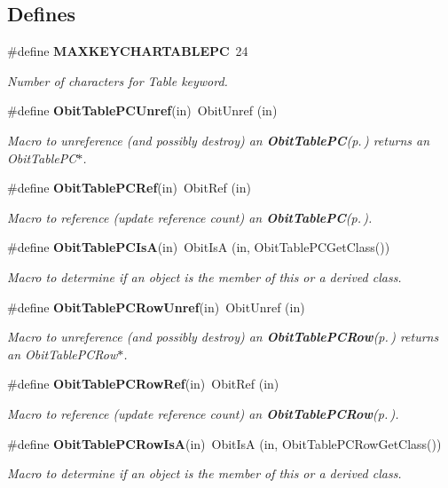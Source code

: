\subsection*{Defines}
\begin{CompactItemize}
\item 
\#define {\bf MAXKEYCHARTABLEPC}\ 24
\begin{CompactList}\small\item\em Number of characters for Table keyword. \item\end{CompactList}\item 
\#define {\bf Obit\-Table\-PCUnref}(in)\ Obit\-Unref (in)
\begin{CompactList}\small\item\em Macro to unreference (and possibly destroy) an {\bf Obit\-Table\-PC}{\rm (p.\,\pageref{structObitTablePC})} returns an Obit\-Table\-PC$\ast$. \item\end{CompactList}\item 
\#define {\bf Obit\-Table\-PCRef}(in)\ Obit\-Ref (in)
\begin{CompactList}\small\item\em Macro to reference (update reference count) an {\bf Obit\-Table\-PC}{\rm (p.\,\pageref{structObitTablePC})}. \item\end{CompactList}\item 
\#define {\bf Obit\-Table\-PCIs\-A}(in)\ Obit\-Is\-A (in, Obit\-Table\-PCGet\-Class())
\begin{CompactList}\small\item\em Macro to determine if an object is the member of this or a derived class. \item\end{CompactList}\item 
\#define {\bf Obit\-Table\-PCRow\-Unref}(in)\ Obit\-Unref (in)
\begin{CompactList}\small\item\em Macro to unreference (and possibly destroy) an {\bf Obit\-Table\-PCRow}{\rm (p.\,\pageref{structObitTablePCRow})} returns an Obit\-Table\-PCRow$\ast$. \item\end{CompactList}\item 
\#define {\bf Obit\-Table\-PCRow\-Ref}(in)\ Obit\-Ref (in)
\begin{CompactList}\small\item\em Macro to reference (update reference count) an {\bf Obit\-Table\-PCRow}{\rm (p.\,\pageref{structObitTablePCRow})}. \item\end{CompactList}\item 
\#define {\bf Obit\-Table\-PCRow\-Is\-A}(in)\ Obit\-Is\-A (in, Obit\-Table\-PCRow\-Get\-Class())
\begin{CompactList}\small\item\em Macro to determine if an object is the member of this or a derived class. \item\end{CompactList}\end{CompactItemize}
